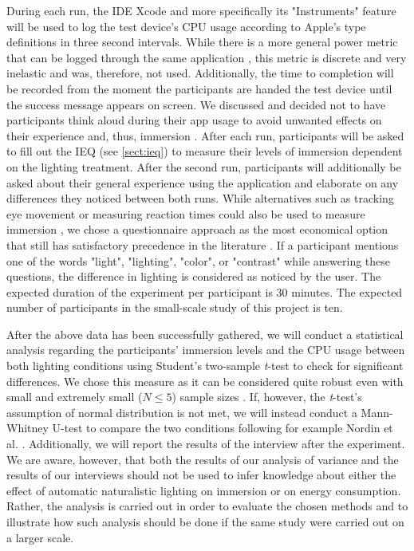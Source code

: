 \documentclass[12pt,twoside,english]{article}
\begin{document}
During each run, the IDE Xcode and more specifically its "Instruments" feature \cite{apple_xcode_nodate} will be used to log the test device's \gls{CPU} usage according to Apple's type definitions \cite{apple_system_nodate} in three second intervals.
While there is a more general power metric that can be logged through the same application \cite{apple_energy_nodate-1}, this metric is discrete and very inelastic and was, therefore, not used.
Additionally, the time to completion will be recorded from the moment the participants are handed the test device until the success message appears on screen.
We discussed and decided not to have participants think aloud during their app usage to avoid unwanted effects on their experience and, thus, immersion \cite{van_den_haak_retrospective_2003}.
After each run, participants will be asked to fill out the \gls{IEQ} (see \ref{sect:ieq}) to measure their levels of immersion dependent on the lighting treatment.
After the second run, participants will additionally be asked about their general experience using the application and elaborate on any differences they noticed between both runs.
While alternatives such as tracking eye movement or measuring reaction times could also be used to measure immersion \cite{jennett_measuring_2008}, we chose a questionnaire approach as the most economical option that still has satisfactory precedence in the literature \cite{boyle_engagement_2012}.
If a participant mentions one of the words "light", "lighting", "color", or "contrast" while answering these questions, the difference in lighting is considered as noticed by the user.
The expected duration of the experiment per participant is 30 minutes.
The expected number of participants in the small-scale study of this project is ten.

After the above data has been successfully gathered, we will conduct a statistical analysis regarding the participants' immersion levels and the CPU usage between both lighting conditions using Student's two-sample \textit{t}-test to check for significant differences.
We chose this measure as it can be considered quite robust even with small and extremely small ($ N \leq 5 $) sample sizes \cite{de_winter_using_2013}.
If, however, the \textit{t}-test's assumption of normal distribution is not met, we will instead conduct a Mann-Whitney U-test to compare the two conditions following for example Nordin et al. \cite{nordin_attention_2013}.
Additionally, we will report the results of the interview after the experiment.
We are aware, however, that both the results of our analysis of variance and the results of our interviews should not be used to infer knowledge about either the effect of automatic naturalistic lighting on immersion or on energy consumption.
Rather, the analysis is carried out in order to evaluate the chosen methods and to illustrate how such analysis should be done if the same study were carried out on a larger scale.
\end{document}
